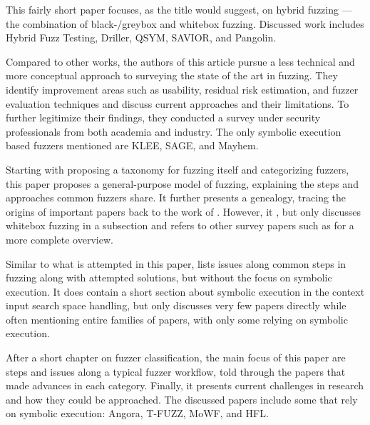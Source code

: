 \documentclass{article}
\begin{document}
\begin{multicols}{2}
    This fairly short paper focuses, as the title would suggest, on hybrid fuzzing — the combination of black-/greybox and whitebox fuzzing. Discussed work includes Hybrid Fuzz Testing\cite{HybridFuzzTesting}, Driller\cite{Driller}, QSYM\cite{QSYM}, SAVIOR\cite{SAVIOR}, and Pangolin\cite{Pangolin}.

    Compared to other works, the authors of this article pursue a less technical and more conceptual approach to surveying the state of the art in fuzzing. They identify improvement areas such as usability, residual risk estimation, and fuzzer evaluation techniques and discuss current approaches and their limitations. To further legitimize their findings, they conducted a survey under security professionals from both academia and industry. The only symbolic execution based fuzzers mentioned are KLEE\cite{KLEE}, SAGE\cite{SAGE}, and Mayhem\cite{Mayhem}.

    Starting with proposing a taxonomy for fuzzing itself and categorizing fuzzers, this paper proposes a general-purpose model of fuzzing, explaining the steps and approaches common fuzzers share. It further presents a genealogy, tracing the origins of important papers back to the work of \citeauthor{UNIX}. However, it \cite{ArtScienceEng}, but only discusses whitebox fuzzing in a subsection and refers to other survey papers such as \cite{Orchestrated, AllYouEverWanted} for a more complete overview.

    Similar to what is attempted in this paper,  lists issues along common steps in fuzzing along with attempted solutions, but without the focus on symbolic execution. It does contain a short section about symbolic execution in the context input search space handling, but only discusses very few papers directly while often mentioning entire families of papers, with only some relying on symbolic execution.

    After a short chapter on fuzzer classification, the main focus of this paper are steps and issues along a typical fuzzer workflow, told through the papers that made advances in each category. Finally, it presents current challenges in research and how they could be approached. The discussed papers include some that rely on symbolic execution: Angora\cite{Angora}, T-FUZZ\cite{TFuzz}, MoWF\cite{MoWF}, and HFL\cite{HFL}.


\end{multicols}
\end{document}
